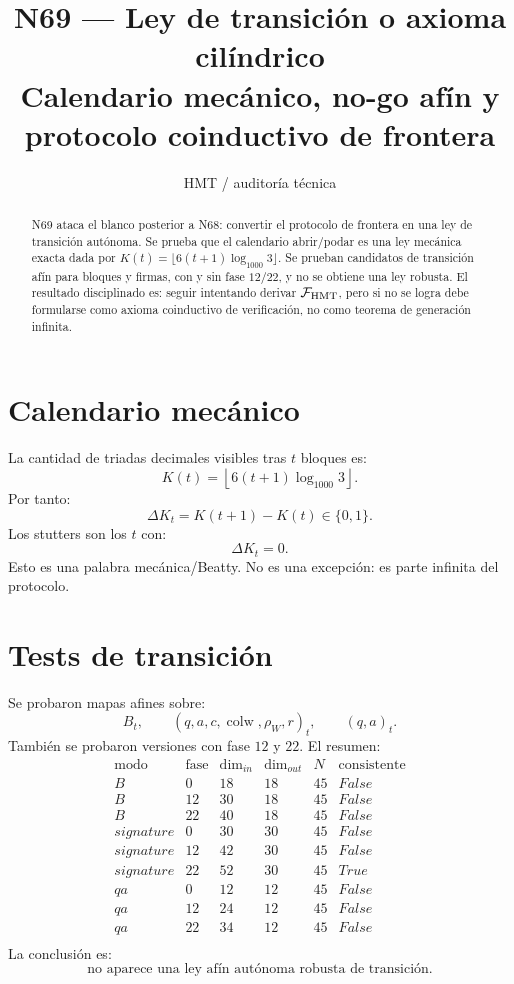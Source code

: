 \documentclass[11pt,a4paper]{article}
\title{\bfseries N69 --- Ley de transición o axioma cilíndrico\\
\large Calendario mecánico, no-go afín y protocolo coinductivo de frontera}
\author{HMT / auditoría técnica}
\date{}
\begin{document}
\maketitle

\begin{abstract}
N69 ataca el blanco posterior a N68: convertir el protocolo de frontera en una ley de transición autónoma. Se prueba que el calendario abrir/podar es una ley mecánica exacta dada por \(K(t)=\lfloor6(t+1)\log_{1000}3\rfloor\). Se prueban candidatos de transición afín para bloques y firmas, con y sin fase \(12/22\), y no se obtiene una ley robusta. El resultado disciplinado es: seguir intentando derivar \(\mathcal F_{\rm HMT}\), pero si no se logra debe formularse como axioma coinductivo de verificación, no como teorema de generación infinita.
\end{abstract}

\section{Calendario mecánico}

La cantidad de triadas decimales visibles tras \(t\) bloques es:
\[
K(t)=\left\lfloor6(t+1)\log_{1000}3\right\rfloor.
\]
Por tanto:
\[
\Delta K_t=K(t+1)-K(t)\in\{0,1\}.
\]
Los stutters son los \(t\) con:
\[
\Delta K_t=0.
\]
Esto es una palabra mecánica/Beatty. No es una excepción: es parte infinita del protocolo.

\section{Tests de transición}

Se probaron mapas afines sobre:
\[
B_t,
\qquad
(q,a,c,\operatorname{colw},\rho_W,r)_t,
\qquad
(q,a)_t.
\]
También se probaron versiones con fase \(12\) y \(22\). El resumen:
\[
\begin{array}{c|c|c|c|c|c}
\text{modo}&\text{fase}&\dim_{in}&\dim_{out}&N&\text{consistente}\\
\hline
B & 0 & 18 & 18 & 45 & False \\
B & 12 & 30 & 18 & 45 & False \\
B & 22 & 40 & 18 & 45 & False \\
signature & 0 & 30 & 30 & 45 & False \\
signature & 12 & 42 & 30 & 45 & False \\
signature & 22 & 52 & 30 & 45 & True \\
qa & 0 & 12 & 12 & 45 & False \\
qa & 12 & 24 & 12 & 45 & False \\
qa & 22 & 34 & 12 & 45 & False \\
\end{array}
\]
La conclusión es:
\[
\boxed{
\text{no aparece una ley afín autónoma robusta de transición.}
}
\]
\end{document}
